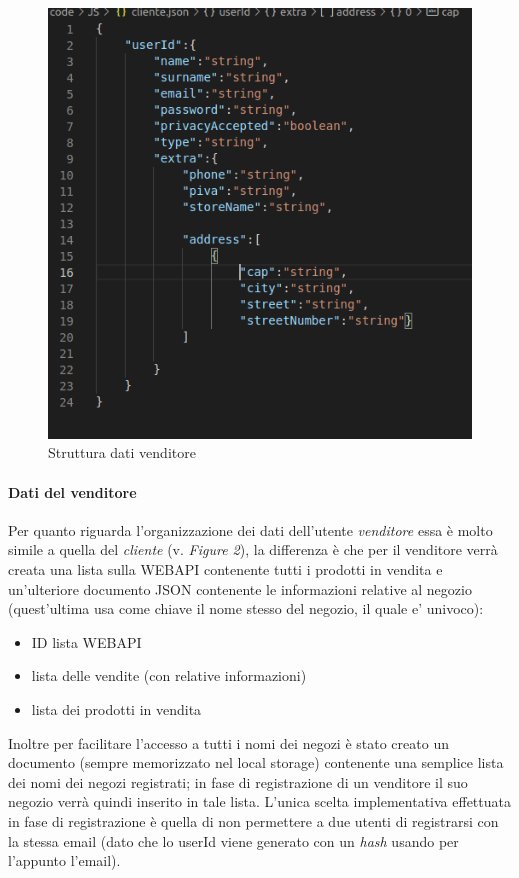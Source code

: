 \documentclass{article}
\begin{document}
    \begin{figure}
        \includegraphics[width=\textwidth,height=\textheight,keepaspectratio] {img/vendor.png} 
        \caption{Struttura dati venditore}
    \end{figure}


    \paragraph{Dati del venditore}
    Per quanto riguarda l'organizzazione dei dati dell'utente \emph{venditore} essa è molto simile a quella del \emph{cliente} (v. \emph{Figure 2}), la differenza è
    che per il venditore verrà creata una lista sulla WEBAPI contenente tutti i prodotti in vendita e un'ulteriore documento JSON contenente le informazioni relative al negozio (quest'ultima usa come chiave il nome stesso del negozio, il quale e' univoco):
    \begin{itemize}
        \item ID lista WEBAPI
        \item lista delle vendite (con relative informazioni)
        \item lista dei prodotti in vendita
    \end{itemize}

    Inoltre per facilitare l'accesso a tutti i nomi dei negozi è stato creato un documento (sempre memorizzato nel local storage) contenente una semplice lista dei nomi dei negozi registrati;
    in fase di registrazione di un venditore il suo negozio verrà quindi inserito in tale lista.
    L'unica scelta implementativa effettuata in fase di registrazione è quella di non permettere a due utenti di registrarsi con la stessa email (dato che lo userId viene generato con un \emph{hash} usando per l'appunto l'email).
\end{document}
